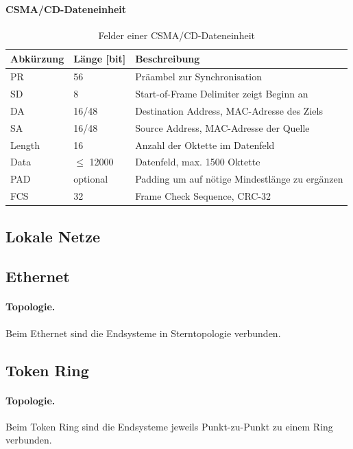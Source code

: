 \documentclass[]{scrartcl}
\begin{document}
\paragraph{CSMA/CD-Dateneinheit}
\begin{table}[H]
\begin{center}
\begin{tabular}{lll}
Abk\"urzung & L\"ange [bit] & Beschreibung \\
\toprule
PR & 56 & Pr\"aambel zur Synchronisation \\
SD & 8 & Start-of-Frame Delimiter zeigt Beginn an \\
DA & 16/48 & Destination Address, MAC-Adresse des Ziels \\
SA & 16/48 & Source Address, MAC-Adresse der Quelle \\
Length & 16 & Anzahl der Oktette im Datenfeld \\
Data & $\le$ 12000 & Datenfeld, max. 1500 Oktette \\
PAD & optional & Padding um auf n\"otige Mindestl\"ange zu erg\"anzen \\
FCS & 32 & Frame Check Sequence, CRC-32 \\
\bottomrule
\end{tabular}
\caption{Felder einer CSMA/CD-Dateneinheit}

\end{center}
\label{default}
\end{table}%




\subsection{Lokale Netze}

\subsection{Ethernet}

\paragraph{Topologie.} Beim Ethernet sind die Endsysteme in Sterntopologie verbunden.

\subsection{Token Ring}

\paragraph{Topologie.} Beim Token Ring sind die Endsysteme jeweils Punkt-zu-Punkt zu einem Ring verbunden. 
\end{document}
